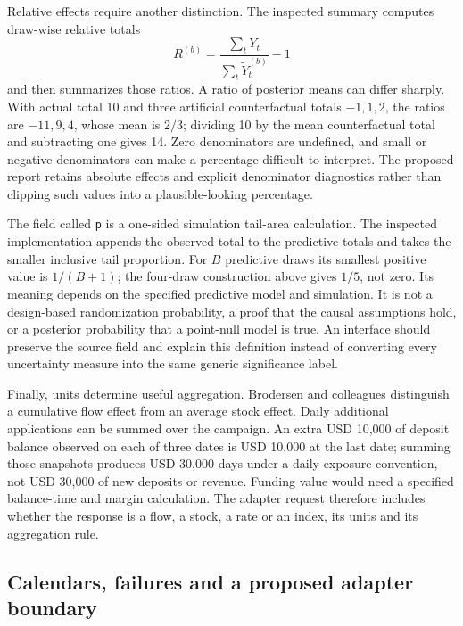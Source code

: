 Relative effects require another distinction. The inspected summary computes
draw-wise relative totals
\[
 R^{(b)}=\frac{\sum_tY_t}{\sum_t\widetilde Y_t^{(b)}}-1
\]
and then summarizes those ratios. A ratio of posterior means can differ
sharply. With actual total 10 and three artificial counterfactual totals
\(-1,1,2\), the ratios are \(-11,9,4\), whose mean is \(2/3\); dividing
10 by the mean counterfactual total and subtracting one gives 14. Zero
denominators are undefined, and small or negative denominators can make a
percentage difficult to interpret. The proposed report retains absolute
effects and explicit denominator diagnostics rather than clipping such
values into a plausible-looking percentage. \cite{exec13_ci_semantics,exec13_cimpact_examples}

The field called \texttt{p} is a one-sided simulation tail-area calculation.
The inspected implementation appends the observed total to the predictive
totals and takes the smaller inclusive tail proportion. For \(B\) predictive
draws its smallest positive value is \(1/(B+1)\); the four-draw construction
above gives \(1/5\), not zero. Its meaning depends on the specified predictive
model and simulation. It is not a design-based randomization probability, a
proof that the causal assumptions hold, or a posterior probability that a
point-null model is true. An interface should preserve the source field and
explain this definition instead of converting every uncertainty measure into
the same generic significance label. \cite{exec13_ci_semantics,exec13_cimpact_examples}

Finally, units determine useful aggregation. Brodersen and colleagues
distinguish a cumulative flow effect from an average stock effect. Daily
additional applications can be summed over the campaign. An extra USD 10,000
of deposit balance observed on each of three dates is USD 10,000 at the last
date; summing those snapshots produces USD 30,000-days under a daily exposure
convention, not USD 30,000 of new deposits or revenue. Funding value would
need a specified balance-time and margin calculation. The adapter request
therefore includes whether the response is a flow, a stock, a rate or an
index, its units and its aggregation rule.
\cite{exec13_ci_brodersen2015,exec13_cimpact_examples}

\subsection{Calendars, failures and a proposed adapter boundary}

